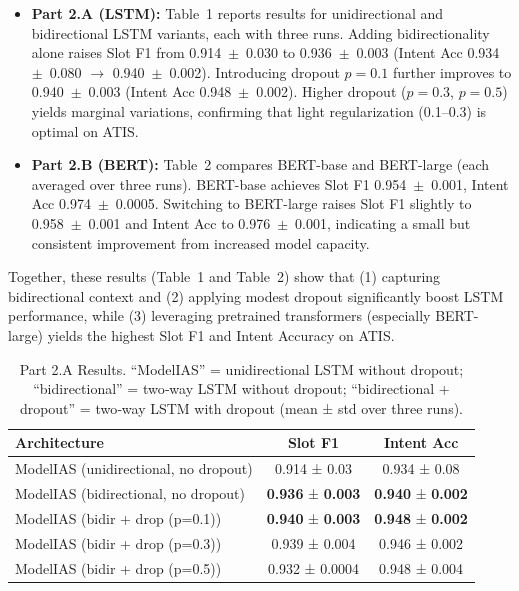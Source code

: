 \documentclass[a4paper]{article}
\begin{document}
\begin{itemize}
  \item \textbf{Part 2.A (LSTM):} 
    Table~1 reports results for unidirectional and bidirectional LSTM variants, each with three runs. Adding bidirectionality alone raises Slot F1 from 0.914~\(\pm\)~0.030 to 0.936~\(\pm\)~0.003 (Intent Acc 0.934~\(\pm\)~0.080 $\rightarrow$ 0.940~\(\pm\)~0.002). Introducing dropout \(p=0.1\) further improves to 0.940~\(\pm\)~0.003 (Intent Acc 0.948~\(\pm\)~0.002). Higher dropout (\(p=0.3\), \(p=0.5\)) yields marginal variations, confirming that light regularization (0.1--0.3) is optimal on ATIS.
  \item \textbf{Part 2.B (BERT):} 
    Table~2 compares BERT-base and BERT-large (each averaged over three runs). BERT-base achieves Slot F1 0.954~\(\pm\)~0.001, Intent Acc 0.974~\(\pm\)~0.0005. Switching to BERT-large raises Slot F1 slightly to 0.958~\(\pm\)~0.001 and Intent Acc to 0.976~\(\pm\)~0.001, indicating a small but consistent improvement from increased model capacity.
\end{itemize}

Together, these results (Table~1 and Table~2) show that (1) capturing bidirectional context and (2) applying modest dropout significantly boost LSTM performance, while (3) leveraging pretrained transformers (especially BERT-large) yields the highest Slot F1 and Intent Accuracy on ATIS.




\clearpage
\onecolumn

\begin{table}[ht]
  \centering
  \begin{tabular}{lcc}
    \hline
    \textbf{Architecture}                          & \textbf{Slot F1}       & \textbf{Intent Acc}    \\
    \hline
    ModelIAS (unidirectional, no dropout)         & 0.914 ± 0.03                & 0.934 ± 0.08                 \\
    ModelIAS (bidirectional, no dropout)          & \textbf{0.936} ± \textbf{0.003}                 & \textbf{0.940} ± \textbf{0.002}                 \\
    \midrule
    ModelIAS (bidir + drop (p=0.1))            & \textbf{0.940} ± \textbf{0.003} & \textbf{0.948} ± \textbf{0.002} \\
    ModelIAS (bidir + drop (p=0.3))            & 0.939 ± 0.004 & 0.946 ± 0.002 \\
    ModelIAS (bidir + drop (p=0.5))            & 0.932 ± 0.0004 & 0.948 ± 0.004 \\
    \hline
  \end{tabular}
  \vspace{2em}
  \caption{Part 2.A Results. “ModelIAS” = unidirectional LSTM without dropout; “bidirectional” = two‐way LSTM without dropout; “bidirectional + dropout” = two‐way LSTM with dropout (mean ± std over three runs).}
\end{table}
\end{document}
